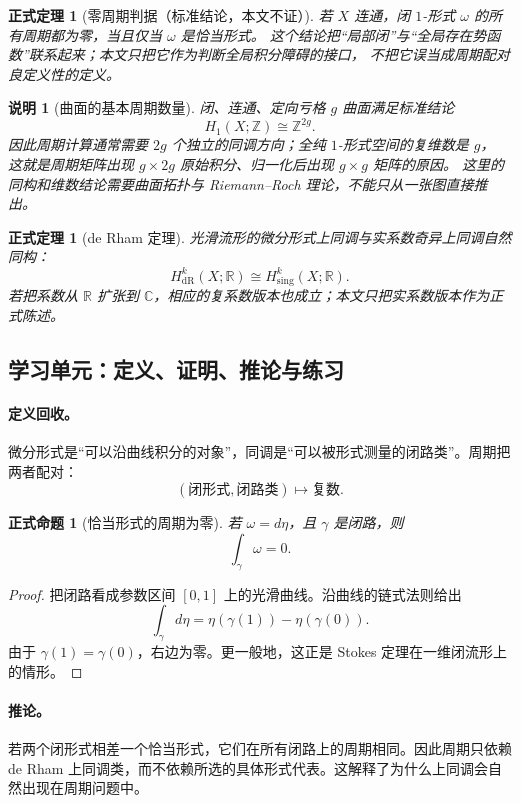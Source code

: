 \documentclass[UTF8,fontset=none,a4paper,11pt]{ctexart}
\theoremstyle{foundation-definition}
\theoremstyle{foundation-theorem}
\newtheorem{theorem}[definition]{正式定理}
\theoremstyle{foundation-proposition}
\newtheorem{proposition}[definition]{正式命题}
\theoremstyle{foundation-example}
\theoremstyle{foundation-remark}
\newtheorem{remark}[definition]{说明}
\theoremstyle{foundation-theorem}
\begin{document}
\begin{theorem}[零周期判据（标准结论，本文不证）]
若 \(X\) 连通，闭 \(1\)-形式 \(\omega\) 的所有周期都为零，当且仅当 \(\omega\) 是恰当形式。
这个结论把“局部闭”与“全局存在势函数”联系起来；本文只把它作为判断全局积分障碍的接口，
不把它误当成周期配对良定义性的定义。
\end{theorem}

\begin{remark}[曲面的基本周期数量]
闭、连通、定向亏格 \(g\) 曲面满足标准结论
\[
H_1(X;\mathbb Z)\cong\mathbb Z^{2g}.
\]
因此周期计算通常需要 \(2g\) 个独立的同调方向；全纯 \(1\)-形式空间的复维数是 \(g\)，
这就是周期矩阵出现 \(g\times 2g\) 原始积分、归一化后出现 \(g\times g\) 矩阵的原因。
这里的同构和维数结论需要曲面拓扑与 Riemann--Roch 理论，不能只从一张图直接推出。
\end{remark}

\begin{theorem}[de Rham 定理]
光滑流形的微分形式上同调与实系数奇异上同调自然同构：
\[
H^k_{\mathrm{dR}}(X;\mathbb R)\cong H^k_{\mathrm{sing}}(X;\mathbb R).
\]
若把系数从 \(\mathbb R\) 扩张到 \(\mathbb C\)，相应的复系数版本也成立；本文只把实系数版本作为正式陈述。
\end{theorem}

\subsection{学习单元：定义、证明、推论与练习}

\paragraph{定义回收。}
微分形式是“可以沿曲线积分的对象”，同调是“可以被形式测量的闭路类”。周期把两者配对：
\[
(\text{闭形式},\text{闭路类})\longmapsto\text{复数}.
\]

\begin{proposition}[恰当形式的周期为零]\label{prop:exact-period-zero}
若 \(\omega=d\eta\)，且 \(\gamma\) 是闭路，则
\[
\int_\gamma\omega=0.
\]
\end{proposition}

\begin{proof}
把闭路看成参数区间 \([0,1]\) 上的光滑曲线。沿曲线的链式法则给出
\[
\int_\gamma d\eta
=\eta(\gamma(1))-\eta(\gamma(0)).
\]
由于 \(\gamma(1)=\gamma(0)\)，右边为零。更一般地，这正是 Stokes 定理在一维闭流形上的情形。
\end{proof}

\paragraph{推论。}
若两个闭形式相差一个恰当形式，它们在所有闭路上的周期相同。因此周期只依赖 de Rham 上同调类，而不依赖所选的具体形式代表。这解释了为什么上同调会自然出现在周期问题中。
\end{document}

